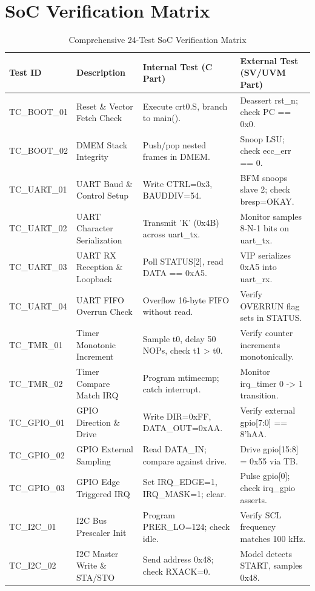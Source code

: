 \documentclass[12pt,a4paper,oneside]{report}
\begin{document}
\section{SoC Verification Matrix}
\begin{table}[htbp]
\centering
\caption{Comprehensive 24-Test SoC Verification Matrix}
\scriptsize
\begin{tabularx}{\textwidth}{llXX}
\toprule
\textbf{Test ID} & \textbf{Description} & \textbf{Internal Test (C Part)} & \textbf{External Test (SV/UVM Part)} \\
\midrule
TC\_BOOT\_01 & Reset \& Vector Fetch Check & Execute crt0.S, branch to main(). & Deassert rst\_n; check PC == 0x0. \\
TC\_BOOT\_02 & DMEM Stack Integrity & Push/pop nested frames in DMEM. & Snoop LSU; check ecc\_err == 0. \\
TC\_UART\_01 & UART Baud \& Control Setup & Write CTRL=0x3, BAUDDIV=54. & BFM snoops slave 2; check bresp=OKAY. \\
TC\_UART\_02 & UART Character Serialization & Transmit 'K' (0x4B) across uart\_tx. & Monitor samples 8-N-1 bits on uart\_tx. \\
TC\_UART\_03 & UART RX Reception \& Loopback & Poll STATUS[2], read DATA == 0xA5. & VIP serializes 0xA5 into uart\_rx. \\
TC\_UART\_04 & UART FIFO Overrun Check & Overflow 16-byte FIFO without read. & Verify OVERRUN flag sets in STATUS. \\
TC\_TMR\_01 & Timer Monotonic Increment & Sample t0, delay 50 NOPs, check t1 > t0. & Verify counter increments monotonically. \\
TC\_TMR\_02 & Timer Compare Match IRQ & Program mtimecmp; catch interrupt. & Monitor irq\_timer 0 -> 1 transition. \\
TC\_GPIO\_01 & GPIO Direction \& Drive & Write DIR=0xFF, DATA\_OUT=0xAA. & Verify external gpio[7:0] == 8'hAA. \\
TC\_GPIO\_02 & GPIO External Sampling & Read DATA\_IN; compare against drive. & Drive gpio[15:8] = 0x55 via TB. \\
TC\_GPIO\_03 & GPIO Edge Triggered IRQ & Set IRQ\_EDGE=1, IRQ\_MASK=1; clear. & Pulse gpio[0]; check irq\_gpio asserts. \\
TC\_I2C\_01 & I2C Bus Prescaler Init & Program PRER\_LO=124; check idle. & Verify SCL frequency matches 100 kHz. \\
TC\_I2C\_02 & I2C Master Write \& STA/STO & Send address 0x48; check RXACK=0. & Model detects START, samples 0x48. \\

\end{tabularx}
\end{table}
\end{document}
